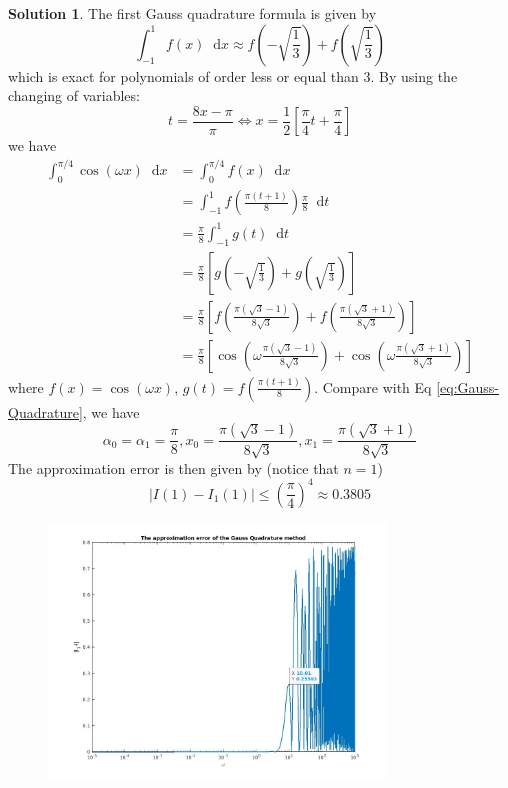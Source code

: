 \documentclass{article}
\newcommand*\diff{\mathop{}\!\mathrm{d}}
\theoremstyle{definition}
\newtheorem{solution}{Solution}
\begin{document}
\begin{solution}
	The first Gauss quadrature formula is given by
	\begin{equation}
		\int_{-1}^{1}f(x)\diff x\approx f\left(-\sqrt{\frac{1}{3}}\right)+f\left(\sqrt{\frac{1}{3}}\right)
	\end{equation}
	which is exact for polynomials of order less or equal than $3$.
	By using the changing of variables:
	\begin{equation}
		t=\frac{8x-\pi}{\pi}\Leftrightarrow x=\frac{1}{2}\left[\frac{\pi}{4}t+\frac{\pi}{4}\right]
	\end{equation}
	we have
	\begin{align*}
	\int_{0}^{\pi/4}\cos(\omega x)\diff x&=\int_{0}^{\pi/4}f(x)\diff x\\
	&=\int_{-1}^{1}f\left(\frac{\pi(t+1)}{8}\right)\frac{\pi}{8}\diff t\\
	&=\frac{\pi}{8}\int_{-1}^{1}g(t)\diff t\\
	&=\frac{\pi}{8}\left[g\left(-\sqrt{\frac{1}{3}}\right)+g\left(\sqrt{\frac{1}{3}}\right)\right]\\
	&=\frac{\pi}{8}\left[f\left(\frac{\pi(\sqrt{3}-1)}{8\sqrt{3}}\right)+f\left(\frac{\pi(\sqrt{3}+1)}{8\sqrt{3}}\right)\right]\\
	&=\frac{\pi}{8}\left[\cos\left(\omega\frac{\pi(\sqrt{3}-1)}{8\sqrt{3}}\right)+\cos\left(\omega\frac{\pi(\sqrt{3}+1)}{8\sqrt{3}}\right)\right]
	\end{align*}
	where $f(x)=\cos(\omega x)$, $g(t)=f\left(\frac{\pi(t+1)}{8}\right)$. Compare with Eq \ref{eq:Gauss-Quadrature}, we have
	\begin{equation}
		\alpha_0=\alpha_1=\frac{\pi}{8}, x_0=\frac{\pi(\sqrt{3}-1)}{8\sqrt{3}}, x_1=\frac{\pi(\sqrt{3}+1)}{8\sqrt{3}}
	\end{equation}
	The approximation error is then given by (notice that $n=1$)
	\begin{equation}
		|I(1)-I_1(1)|\leq \left(\frac{\pi}{4}\right)^4\approx 0.3805
	\end{equation}
	\begin{figure}[ht]
      \label{Fig:error_of_approximation}
      \includegraphics[width=0.8\textwidth]{problem3_error_figure.jpg}

\end{figure}
\end{solution}
\end{document}
